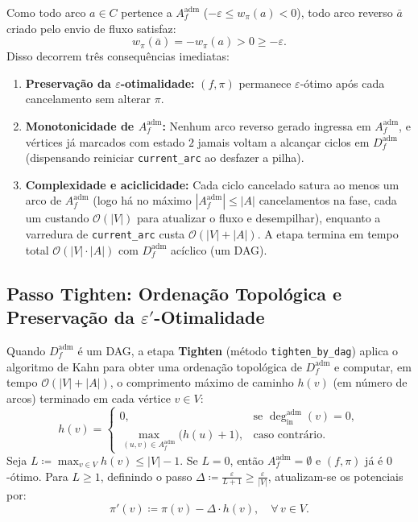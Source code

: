 Como todo arco $a \in C$ pertence a $A_f^{\text{adm}}$ ($-\varepsilon \le w_\pi(a) < 0$), todo arco reverso $\bar{a}$ criado pelo envio de fluxo satisfaz:
\begin{equation}
    w_\pi(\bar{a}) = -w_\pi(a) > 0 \ge -\varepsilon.
\end{equation}
Disso decorrem três consequências imediatas:
\begin{enumerate}
    \item \textbf{Preservação da $\varepsilon$-otimalidade:} $(f, \pi)$ permanece $\varepsilon$-ótimo após cada cancelamento sem alterar $\pi$.
    \item \textbf{Monotonicidade de $A_f^{\text{adm}}$:} Nenhum arco reverso gerado ingressa em $A_f^{\text{adm}}$, e vértices já marcados com estado $2$ jamais voltam a alcançar ciclos em $D_f^{\text{adm}}$ (dispensando reiniciar \lstinline{current_arc} ao desfazer a pilha).
    \item \textbf{Complexidade e aciclicidade:} Cada ciclo cancelado satura ao menos um arco de $A_f^{\text{adm}}$ (logo há no máximo $|A_f^{\text{adm}}| \le |A|$ cancelamentos na fase, cada um custando $\mathcal{O}(|V|)$ para atualizar o fluxo e desempilhar), enquanto a varredura de \lstinline{current_arc} custa $\mathcal{O}(|V| + |A|)$. A etapa termina em tempo total $\mathcal{O}(|V| \cdot |A|)$ com $D_f^{\text{adm}}$ acíclico (um DAG).
\end{enumerate}


\subsection{Passo Tighten: Ordenação Topológica e Preservação da $\varepsilon'$-Otimalidade}

Quando $D_f^{\text{adm}}$ é um DAG, a etapa \textbf{Tighten} (método \lstinline{tighten_by_dag}) aplica o algoritmo de Kahn para obter uma ordenação topológica de $D_f^{\text{adm}}$ e computar, em tempo $\mathcal{O}(|V| + |A|)$, o comprimento máximo de caminho $h(v)$ (em número de arcos) terminado em cada vértice $v \in V$:
\begin{equation}
    h(v) = \begin{cases}
        0, & \text{se } \deg_{\text{in}}^{\text{adm}}(v) = 0, \\
        \max_{(u,v) \in A_f^{\text{adm}}} \bigl(h(u) + 1\bigr), & \text{caso contrário.}
    \end{cases}
\end{equation}
Seja $L \coloneqq \max_{v \in V} h(v) \le |V| - 1$. Se $L = 0$, então $A_f^{\text{adm}} = \emptyset$ e $(f, \pi)$ já é $0$-ótimo. Para $L \ge 1$, definindo o passo $\Delta \coloneqq \frac{\varepsilon}{L + 1} \ge \frac{\varepsilon}{|V|}$, atualizam-se os potenciais por:
\begin{equation}\label{eq:tighten_update}
    \pi'(v) \coloneqq \pi(v) - \Delta \cdot h(v), \quad \forall\, v \in V.
\end{equation}

